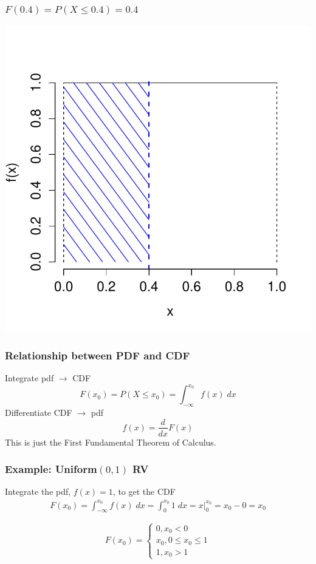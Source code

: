 \documentclass[handout]{beamer}
\begin{document}
\begin{frame}
\frametitle{$F(0.4) = P(X\leq 0.4) = 0.4$}
\centering
	\includegraphics[scale = 0.6]{./images/uniform_density_cdf}

\end{frame}




\begin{frame}
\frametitle{Relationship between PDF and CDF}

Integrate pdf $\rightarrow$ CDF
	$$F(x_0) = P(X\leq x_0) = \int_{-\infty}^{x_0} f(x)\; dx$$
Differentiate CDF $\rightarrow$ pdf
 	$$f(x) =\frac{d}{dx}F(x)$$
\alert{This is just the First Fundamental Theorem of Calculus.}
\end{frame}


\begin{frame}
\frametitle{Example: Uniform$(0,1)$ RV}

Integrate the pdf, $f(x) = 1$, to get the CDF
\begin{eqnarray*}
	F(x_0) =\int_{-\infty}^{x_0} f(x)\; dx = \int_{0}^{x_0} 1\; dx =  \left. x \right|_0^{x_0} =  x_0 - 0 = x_0
\end{eqnarray*}

\vspace{1em}
$$ F(x_0) = \left\{ \begin{array}{c} 0, x_0 < 0\\ x_0, 0\leq x_0 \leq 1\\ 1, x_0 > 1   \end{array}\right.$$
\end{frame}
\end{document}
